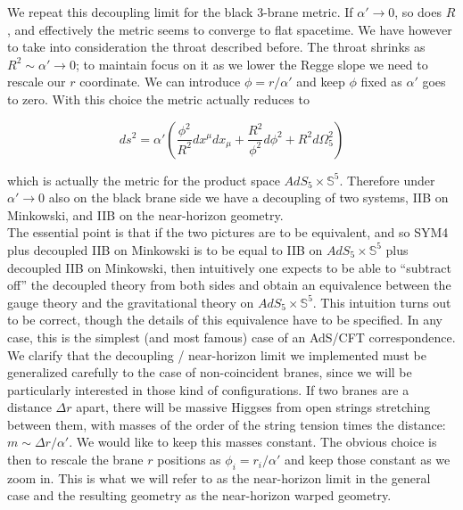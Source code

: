 We repeat this decoupling limit for the black 3-brane metric. If $\alpha' \rightarrow 0$, so does $R$, and effectively the metric seems to converge to flat spacetime. We have however to take into consideration the throat described before. The throat shrinks as $R^2 \sim \alpha' \rightarrow 0$; to maintain focus on it as we lower the Regge slope we need to rescale our $r$ coordinate. We can introduce $\phi = r/\alpha'$ and keep $\phi$ fixed as $\alpha'$ goes to zero. With this choice the metric actually reduces to

\begin{equation}
	ds^2 = \alpha' \left( \frac{\phi^2 }{R^2}dx^\mu dx_\mu + \frac{R^2}{\phi^2} d\phi^2 + R^2 d\Omega_5^2 \right)
	\label{}
\end{equation}

which is actually the metric for the product space $AdS_5 \times \mathbb{S}^5$. Therefore under $\alpha' \rightarrow 0$ also on the black brane side we have a decoupling of two systems, IIB on Minkowski, and IIB on the near-horizon geometry.\\

The essential point is that if the two pictures are to be equivalent, and so SYM4 plus decoupled IIB on Minkowski is to be equal to IIB on $AdS_5 \times \mathbb{S}^5$ plus decoupled IIB on Minkowski, then intuitively one expects to be able to ``subtract off'' the decoupled theory from both sides and obtain an equivalence between the gauge theory and the gravitational theory on $AdS_5 \times \mathbb{S}^5$. This intuition turns out to be correct, though the details of this equivalence have to be specified. In any case, this is the simplest (and most famous) case of an AdS/CFT correspondence.\\

We clarify that the decoupling / near-horizon limit we implemented must be generalized carefully to the case of non-coincident branes, since we will be particularly interested in those kind of configurations. If two branes are a distance $\Delta r$ apart, there will be massive Higgses from open strings stretching between them, with masses of the order of the string tension times the distance: $m \sim \Delta r / \alpha'$. We would like to keep this masses constant. The obvious choice is then to rescale the brane $r$ positions as $\phi_i = r_i / \alpha'$ and keep those constant as we zoom in. This is what we will refer to as the near-horizon limit in the general case and the resulting geometry as the near-horizon warped geometry.\\

